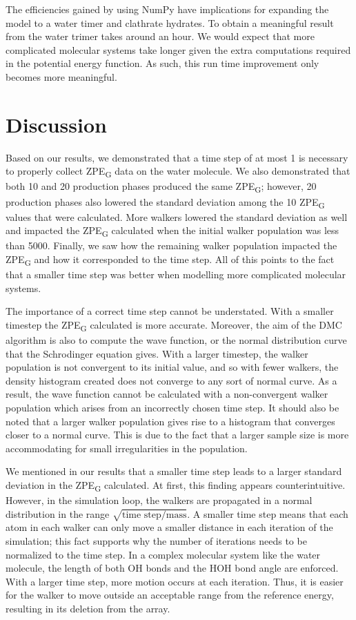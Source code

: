 \documentclass[journal=jacsat,manuscript=article]{achemso}
\begin{document}
The efficiencies gained by using NumPy have implications for expanding the model to a water timer and clathrate hydrates. To obtain a meaningful result from the water trimer takes around an hour. We would expect that more complicated molecular systems take longer given the extra computations required in the potential energy function. As such, this run time improvement only becomes more meaningful.

\section{Discussion}

Based on our results, we demonstrated that a time step of at most 1 is necessary to properly collect ZPE\textsubscript{G} data on the water molecule. We also demonstrated that both 10 and 20 production phases produced the same ZPE\textsubscript{G}; however, 20 production phases also lowered the standard deviation among the 10 ZPE\textsubscript{G} values that were calculated. More walkers lowered the standard deviation as well and impacted the ZPE\textsubscript{G} calculated when the initial walker population was less than 5000. Finally, we saw how the remaining walker population impacted the ZPE\textsubscript{G} and how it corresponded to the time step. All of this points to the fact that a smaller time step was better when modelling more complicated molecular systems. 

The importance of a correct time step cannot be understated. With a smaller timestep the ZPE\textsubscript{G} calculated is more accurate. Moreover, the aim of the DMC algorithm is also to compute the wave function, or the normal distribution curve that the Schrodinger equation gives. With a larger timestep, the walker population is not convergent to its initial value, and so with fewer walkers, the density histogram created does not converge to any sort of normal curve. As a result, the wave function cannot be calculated with a non-convergent walker population which arises from an incorrectly chosen time step. It should also be noted that a larger walker population gives rise to a histogram that converges closer to a normal curve. This is due to the fact that a larger sample size is more accommodating for small irregularities in the population. 

We mentioned in our results that a smaller time step leads to a larger standard deviation in the ZPE\textsubscript{G} calculated. At first, this finding appears counterintuitive. However, in the simulation loop, the walkers are propagated in a normal distribution in the range $\sqrt{\text{time step}/\text{mass}}$. A smaller time step means that each atom in each walker can only move a smaller distance in each iteration of the simulation; this fact supports why the number of iterations needs to be normalized to the time step. In a complex molecular system like the water molecule, the length of both OH bonds and the HOH bond angle are enforced. With a larger time step, more motion occurs at each iteration. Thus, it is easier for the walker to move outside an acceptable range from the reference energy, resulting in its deletion from the array. 
\end{document}
